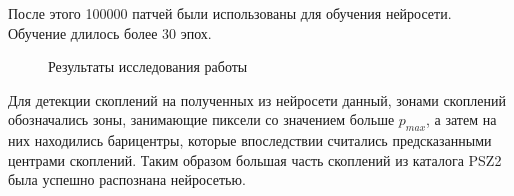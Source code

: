 После этого 100000 патчей были использованы для обучения нейросети. Обучение длилось более 30 эпох. \\ 
\begin{figure}[h!]
	\center{\texttt{[image: sz0]}}
	\caption{Результаты исследования работы \cite{Bonjean}}
\end{figure}

Для детекции скоплений на полученных из нейросети данный, зонами скоплений обозначались зоны, 
занимающие пиксели со значением больше $p_{max}$, а затем на них находились барицентры, которые 
впоследствии считались предсказанными центрами скоплений. Таким образом большая часть скоплений из 
каталога PSZ2 была успешно распознана нейросетью. \\

